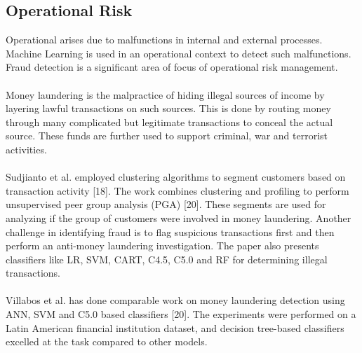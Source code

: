 \documentclass[a4paper, 12pt]{article}
\begin{document}
\subsection{Operational Risk}
\noindent Operational arises due to malfunctions in internal and external processes. Machine Learning is used in an operational context to detect such malfunctions. Fraud detection is a significant area of focus of operational risk management.
\\
\\
\noindent Money laundering is the malpractice of hiding illegal sources of income by layering lawful transactions on such sources. This is done by routing money through many complicated but legitimate transactions to conceal the actual source. These funds are further used to support criminal, war and terrorist activities.
\\
\\
\noindent Sudjianto et al. employed clustering algorithms to segment customers based on transaction activity [18]. The work combines clustering and profiling to perform unsupervised peer group analysis (PGA) [20]. These segments are used for analyzing if the group of customers were involved in money laundering. Another challenge in identifying fraud is to flag suspicious transactions first and then perform an anti-money laundering investigation. The paper also presents classifiers like LR, SVM, CART, C4.5, C5.0 and RF for determining illegal transactions.
\\
\\
\noindent Villabos et al. has done comparable work on money laundering detection using ANN, SVM and C5.0 based classifiers [20]. The experiments were performed on a Latin American financial institution dataset, and decision tree-based classifiers excelled at the task compared to other models. 


\newpage
\end{document}
